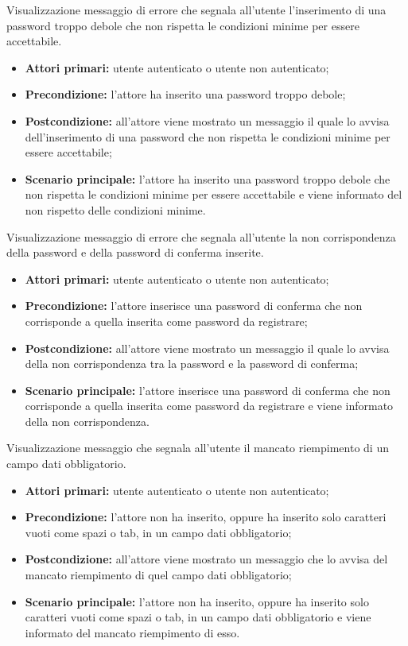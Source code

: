 Visualizzazione messaggio di errore che segnala all'utente l'inserimento di una password troppo debole che non rispetta le condizioni minime per essere accettabile.
\begin{itemize}
    \item \textbf{Attori primari:} utente autenticato o utente non autenticato;
    \item \textbf{Precondizione:} l'attore ha inserito una password troppo debole;
    \item \textbf{Postcondizione:} all'attore viene mostrato un messaggio il quale lo avvisa dell'inserimento di una password che non rispetta le condizioni minime per essere accettabile;
    \item \textbf{Scenario principale:} l'attore ha inserito una password troppo debole che non rispetta le condizioni minime per essere accettabile e viene informato del non rispetto delle condizioni minime.
\end{itemize}

Visualizzazione messaggio di errore che segnala all'utente la non corrispondenza della password e della password di conferma inserite.
\begin{itemize}
    \item \textbf{Attori primari:} utente autenticato o utente non autenticato;
    \item \textbf{Precondizione:} l'attore inserisce una password di conferma che non corrisponde a quella inserita come password da registrare;
    \item \textbf{Postcondizione:} all'attore viene mostrato un messaggio il quale lo avvisa della non corrispondenza tra la password e la password di conferma;
    \item \textbf{Scenario principale:} l'attore inserisce una password di conferma che non corrisponde a quella inserita come password da registrare e viene informato della non corrispondenza.
\end{itemize}

Visualizzazione messaggio che segnala all'utente il mancato riempimento di un campo dati obbligatorio.
\begin{itemize}
    \item \textbf{Attori primari:} utente autenticato o utente non autenticato;
    \item \textbf{Precondizione:} l'attore non ha inserito, oppure ha inserito solo caratteri vuoti come spazi o tab, in un campo dati obbligatorio;
    \item \textbf{Postcondizione:} all'attore viene mostrato un messaggio che lo avvisa del mancato riempimento di quel campo dati obbligatorio;
    \item \textbf{Scenario principale:} l'attore non ha inserito, oppure ha inserito solo caratteri vuoti come spazi o tab, in un campo dati obbligatorio e viene informato del mancato riempimento di esso.
\end{itemize}

